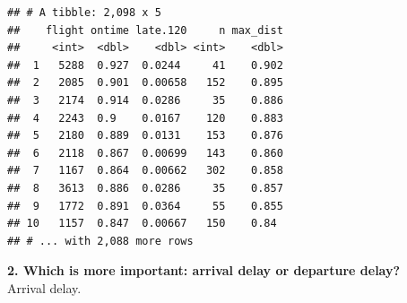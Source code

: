 \documentclass[]{book}
\newenvironment{Shaded}{\begin{snugshade}}{\end{snugshade}}
\newcommand{\DataTypeTok}[1]{\textcolor[rgb]{0.13,0.29,0.53}{#1}}
\newcommand{\DecValTok}[1]{\textcolor[rgb]{0.00,0.00,0.81}{#1}}
\newcommand{\FloatTok}[1]{\textcolor[rgb]{0.00,0.00,0.81}{#1}}
\newcommand{\KeywordTok}[1]{\textcolor[rgb]{0.13,0.29,0.53}{\textbf{#1}}}
\newcommand{\NormalTok}[1]{#1}
\newcommand{\OperatorTok}[1]{\textcolor[rgb]{0.81,0.36,0.00}{\textbf{#1}}}
\newcommand{\OtherTok}[1]{\textcolor[rgb]{0.56,0.35,0.01}{#1}}
\newcommand{\StringTok}[1]{\textcolor[rgb]{0.31,0.60,0.02}{#1}}
\theoremstyle{definition}
\theoremstyle{definition}
\theoremstyle{definition}
\theoremstyle{remark}
\begin{document}
\begin{Shaded}
\end{Shaded}

\begin{verbatim}
## # A tibble: 2,098 x 5
##    flight ontime late.120     n max_dist
##     <int>  <dbl>    <dbl> <int>    <dbl>
##  1   5288  0.927  0.0244     41    0.902
##  2   2085  0.901  0.00658   152    0.895
##  3   2174  0.914  0.0286     35    0.886
##  4   2243  0.9    0.0167    120    0.883
##  5   2180  0.889  0.0131    153    0.876
##  6   2118  0.867  0.00699   143    0.860
##  7   1167  0.864  0.00662   302    0.858
##  8   3613  0.886  0.0286     35    0.857
##  9   1772  0.891  0.0364     55    0.855
## 10   1157  0.847  0.00667   150    0.84 
## # ... with 2,088 more rows
\end{verbatim}

\textbf{2. Which is more important: arrival delay or departure delay?}\\
Arrival delay.
\end{document}
